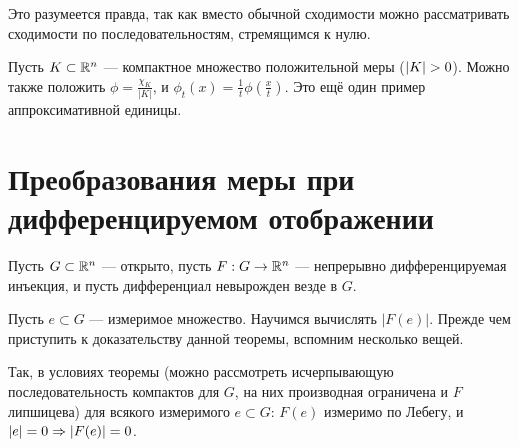 \documentclass[a4paper]{report}
\begin{document}
    Это разумеется правда, так как вместо обычной сходимости можно рассматривать сходимости по последовательностям, стремящимся к нулю.

    Пусть $K \subset \mathbb{R}^n$ --- компактное множество положительной меры ($\left|K\right| > 0$).
    Можно также положить $\phi = \frac{\chi_K}{|K|}$, и $\phi_t(x) = \frac{1}{t}\phi\left(\frac{x}{t}\right)$.
    Это ещё один пример аппроксимативной единицы.


    \section{Преобразования меры при дифференцируемом отображении}
    Пусть $G \subset \mathbb{R}^n$ --- открыто, пусть $F: G \rightarrow \mathbb{R}^n$ --- непрерывно дифференцируемая инъекция, и пусть дифференциал невырожден везде в $G$.

    Пусть $e \subset G$ --- измеримое множество.
    Научимся вычислять $|F(e)|$.
    Прежде чем приступить к доказательству данной теоремы, вспомним несколько вещей.

    Так, в условиях теоремы (можно рассмотреть исчерпывающую последовательность компактов для $G$, на них производная ограничена и $F$ липшицева) для всякого измеримого $e \subset G$: $F(e)$ измеримо по Лебегу, и $|e| = 0 \Rightarrow |F(e)| = 0$.
\end{document}

